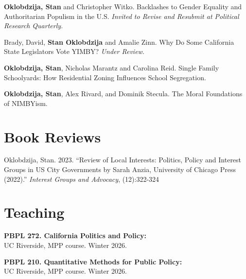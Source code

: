\documentclass[margin,line]{res}
\begin{document}
\begin{resume}
\textbf{Oklobdzija, Stan} and Christopher Witko. Backlashes to Gender Equality and Authoritarian
Populism in the U.S. \textit{Invited to Revise and Resubmit at Political Research Quarterly.}

Brady, David, \textbf{Stan Oklobdzija} and Amalie Zinn. Why Do Some California State Legislators Vote YIMBY? \textit{Under Review.}

\textbf{Oklobdzija, Stan}, Nicholas Marantz and Carolina Reid. Single Family Schoolyards: How Residential Zoning Influences School Segregation.

\textbf{Oklobdzija, Stan}, Alex Rivard, and Dominik Stecula. The Moral Foundations of NIMBYism.








\section{Book Reviews}
Oklobdzija, Stan. 2023. ``Review of Local Interests: Politics, Policy and Interest Groups in US City Governments by Sarah Anzia, University of Chicago Press (2022).'' \textit{Interest Groups and Advocacy}, (12):322-324 




\section{\sc Teaching} 

{\bf PBPL 272. California Politics and Policy:}\\
UC Riverside, MPP course. Winter 2026.

{\bf PBPL 210. Quantitative Methods for Public Policy:}\\
UC Riverside, MPP course. Winter 2026.


\end{resume}
\end{document}
